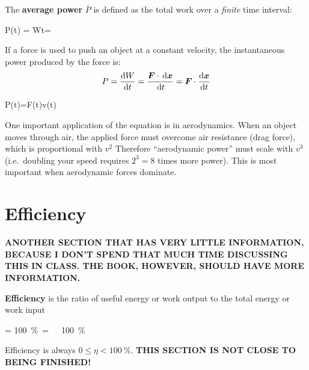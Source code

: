 The \textbf{average power} $\overline P$ is defined as the total work over a
\emph{finite} time interval:
\begin{important-equation}
  \overline P(t) = \frac W{\Delta t}=
\end{important-equation}
If a force is used to push an object at a constant velocity, the instantaneous
power produced by the force is:
\begin{equation}
  P=\diff Wt=\frac{\bm F\cdot\dl{\bm x}}{\dl t}
  =\bm F\cdot\diff{\bm x}t
\end{equation}
\begin{important-equation}
  P(t)=\bm F(t)\cdot\bm v(t)
\end{important-equation}
One important application of the equation is in aerodynamics. When an object
moves through air, the applied force must overcome air resistance (drag force),
which is proportional with $v^2$ Therefore ``aerodynamic power'' must scale
with $v^3$ (i.e.\ doubling your speed requires $2^3=8$ times more power). This
is most important when aerodynamic forces dominate.




\section{Efficiency}

\textbf{ANOTHER SECTION THAT HAS VERY LITTLE INFORMATION, BECAUSE I DON'T SPEND
  THAT MUCH TIME DISCUSSING THIS IN CLASS. THE BOOK, HOWEVER, SHOULD HAVE MORE
  INFORMATION.}

\textbf{Efficiency} is the ratio of useful energy or work output to the total
energy or work input
\begin{important-equation}
  \eta
  = \times\SI{100}\percent
  = \times\SI{100}\percent
\end{important-equation}
Efficiency is always $0\leq\eta<\SI{100}\percent$.
\textbf{THIS SECTION IS NOT CLOSE TO BEING FINISHED!}



